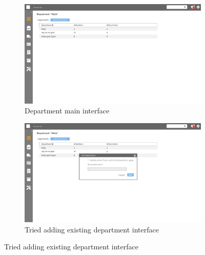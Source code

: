 \begin{figure}[H]
	\centering
	\begin{subfigure}[b]{0.48\textwidth}
		\includegraphics[width=\textwidth]{billeder/iteration3Prototyper/Page_22.jpg}
		\caption{Department main interface}
		\label{fig:5-Depart}
	\end{subfigure}
	\quad
	\begin{subfigure}[b]{0.48\textwidth}
		\includegraphics[width=\textwidth]{billeder/iteration3Prototyper/Page_24.jpg}
		\caption{Tried adding existing department interface}
		\label{fig:5-AddDepWrong}
	\end{subfigure}
\end{figure}
